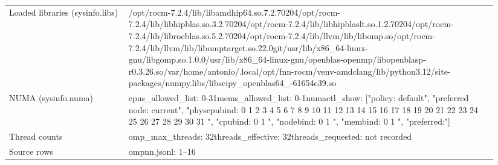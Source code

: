 \begin{longtable}{>{\raggedright\arraybackslash}p{0.23\linewidth}>{\raggedright\arraybackslash}p{0.71\linewidth}}
Loaded libraries (sysinfo.libs) & /\allowbreak{}opt/\allowbreak{}rocm-7.2.4/\allowbreak{}lib/\allowbreak{}libamdhip64.so.7.2.70204\newline /\allowbreak{}opt/\allowbreak{}rocm-7.2.4/\allowbreak{}lib/\allowbreak{}libhipblas.so.3.2.70204\newline /\allowbreak{}opt/\allowbreak{}rocm-7.2.4/\allowbreak{}lib/\allowbreak{}libhipblaslt.so.1.2.70204\newline /\allowbreak{}opt/\allowbreak{}rocm-7.2.4/\allowbreak{}lib/\allowbreak{}librocblas.so.5.2.70204\newline /\allowbreak{}opt/\allowbreak{}rocm-7.2.4/\allowbreak{}lib/\allowbreak{}llvm/\allowbreak{}lib/\allowbreak{}libomp.so\newline /\allowbreak{}opt/\allowbreak{}rocm-7.2.4/\allowbreak{}lib/\allowbreak{}llvm/\allowbreak{}lib/\allowbreak{}libomptarget.so.22.0git\newline /\allowbreak{}usr/\allowbreak{}lib/\allowbreak{}x86\_\allowbreak{}64-linux-gnu/\allowbreak{}libgomp.so.1.0.0\newline /\allowbreak{}usr/\allowbreak{}lib/\allowbreak{}x86\_\allowbreak{}64-linux-gnu/\allowbreak{}openblas-openmp/\allowbreak{}libopenblasp-r0.3.26.so\newline /\allowbreak{}var/\allowbreak{}home/\allowbreak{}antonio/\allowbreak{}.local/\allowbreak{}opt/\allowbreak{}fnn-rocm/\allowbreak{}venv-amdclang/\allowbreak{}lib/\allowbreak{}python3.12/\allowbreak{}site-packages/\allowbreak{}numpy.libs/\allowbreak{}libscipy\_\allowbreak{}openblas64\_\allowbreak{}-61654e39.so \\
NUMA (sysinfo.numa) & cpus\_\allowbreak{}allowed\_\allowbreak{}list: 0-31\newline mems\_\allowbreak{}allowed\_\allowbreak{}list: 0-1\newline numactl\_\allowbreak{}show: ["policy: default", "preferred node: current", "physcpubind: 0 1 2 3 4 5 6 7 8 9 10 11 12 13 14 15 16 17 18 19 20 21 22 23 24 25 26 27 28 29 30 31 ", "cpubind: 0 1 ", "nodebind: 0 1 ", "membind: 0 1 ", "preferred:"] \\
Thread counts & omp\_\allowbreak{}max\_\allowbreak{}threads: 32\newline threads\_\allowbreak{}effective: 32\newline threads\_\allowbreak{}requested: not recorded \\
Source rows & ompnn.jsonl: 1–16 \\
\end{longtable}
